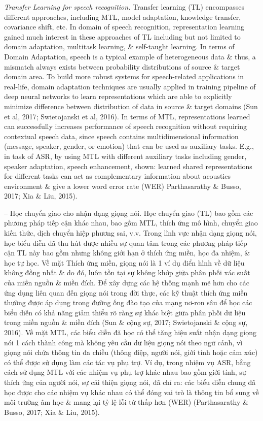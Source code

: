 \documentclass{article}
\begin{document}
\begin{itemize}
\begin{itemize}
\begin{itemize}
            {\it Transfer Learning for speech recognition.} Transfer learning (TL) encompasses different approaches, including MTL, model adaptation, knowledge transfer, covariance shift, etc. In domain of speech recognition, representation learning gained much interest in these approaches of TL including but not limited to domain adaptation, multitask learning, \& self-taught learning. In terms of Domain Adaptation, speech is a typical example of heterogeneous data \& thus, a mismatch always exists between probability distributions of source \& target domain area. To build more robust systems for speech-related applications in real-life, domain adaptation techniques are usually applied in training pipeline of deep neural networks to learn representations which are able to explicitly minimize difference between distribution of data in source \& target domains (Sun et al, 2017; Swietojanski et al, 2016). In terms of MTL, representations learned can successfully increases performance of speech recognition without requiring contextual speech data, since speech contains multidimensional information (message, speaker, gender, or emotion) that can be used as auxiliary tasks. E.g., in task of ASR, by using MTL with different auxiliary tasks including gender, speaker adaptation, speech enhancement, shown: learned shared representations for different tasks can act as complementary information about acoustics environment \& give a lower word error rate (WER) Parthasarathy \& Busso, 2017; Xia \& Liu, 2015).

            -- Học chuyển giao cho nhận dạng giọng nói. Học chuyển giao (TL) bao gồm các phương pháp tiếp cận khác nhau, bao gồm MTL, thích ứng mô hình, chuyển giao kiến thức, dịch chuyển hiệp phương sai, v.v. Trong lĩnh vực nhận dạng giọng nói, học biểu diễn đã thu hút được nhiều sự quan tâm trong các phương pháp tiếp cận TL này bao gồm nhưng không giới hạn ở thích ứng miền, học đa nhiệm, \& học tự học. Về mặt Thích ứng miền, giọng nói là 1 ví dụ điển hình về dữ liệu không đồng nhất \& do đó, luôn tồn tại sự không khớp giữa phân phối xác suất của miền nguồn \& miền đích. Để xây dựng các hệ thống mạnh mẽ hơn cho các ứng dụng liên quan đến giọng nói trong đời thực, các kỹ thuật thích ứng miền thường được áp dụng trong đường ống đào tạo của mạng nơ-ron sâu để học các biểu diễn có khả năng giảm thiểu rõ ràng sự khác biệt giữa phân phối dữ liệu trong miền nguồn \& miền đích (Sun \& cộng sự, 2017; Swietojanski \& cộng sự, 2016). Về mặt MTL, các biểu diễn đã học có thể tăng hiệu suất nhận dạng giọng nói 1 cách thành công mà không yêu cầu dữ liệu giọng nói theo ngữ cảnh, vì giọng nói chứa thông tin đa chiều (thông điệp, người nói, giới tính hoặc cảm xúc) có thể được sử dụng làm các tác vụ phụ trợ. Ví dụ, trong nhiệm vụ ASR, bằng cách sử dụng MTL với các nhiệm vụ phụ trợ khác nhau bao gồm giới tính, sự thích ứng của người nói, sự cải thiện giọng nói, đã chỉ ra: các biểu diễn chung đã học được cho các nhiệm vụ khác nhau có thể đóng vai trò là thông tin bổ sung về môi trường âm học \& mang lại tỷ lệ lỗi từ thấp hơn (WER) (Parthasarathy \& Busso, 2017; Xia \& Liu, 2015).


\end{itemize}
\end{itemize}
\end{itemize}
\end{document}
